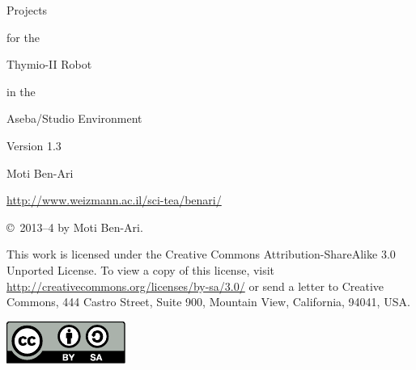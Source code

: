 \thispagestyle{empty}

\begin{center}
\begin{bfseries}
\begin{LARGE}
Projects 

for the 

Thymio-II Robot

in the 

Aseba/Studio Environment

\bigskip
\end{LARGE}

\begin{large}
Version 1.3
\end{large}

\begin{LARGE}
\bigskip\bigskip\bigskip\bigskip

Moti Ben-Ari

\bigskip
\end{LARGE}

\begin{large}
\url{http://www.weizmann.ac.il/sci-tea/benari/}
\end{large}
\end{bfseries}
\end{center}

\vfill

\begin{center}
\copyright{}\  2013--4 by Moti Ben-Ari. 
\end{center}

This work is licensed under the Creative Commons
Attribution-ShareAlike 3.0 Unported License. To view a copy
of this license, visit
\url{http://creativecommons.org/licenses/by-sa/3.0/}
or send a letter to Creative Commons, 444 Castro Street, Suite 900,
Mountain View, California, 94041, USA.

\begin{center}
\includegraphics[width=.2\textwidth]{../images/by-sa}
\end{center}

\tableofcontents
\thispagestyle{empty}
